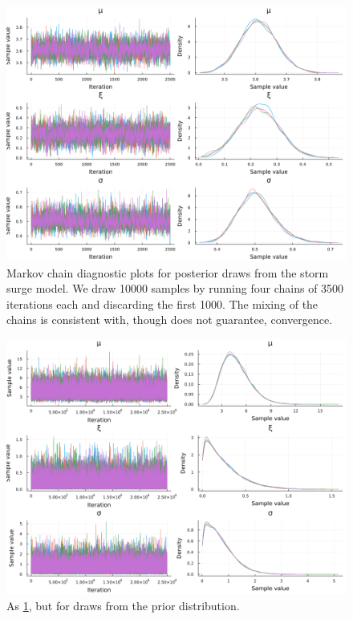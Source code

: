 \documentclass[11pt]{article}
\begin{document}
\begin{figure}
    \centering
    \includegraphics[width=\textwidth]{surge-posterior-chains}
    \caption{
        Markov chain diagnostic plots for posterior draws from the storm surge model.
        We draw \num{10000} samples by running four chains of \num{3500} iterations each and discarding the first \num{1000}.
        The mixing of the chains is consistent with, though does not guarantee, convergence.
    }\label{fig:surge-posterior-chains}
\end{figure}

\begin{figure}
    \centering
    \includegraphics[width=\textwidth]{surge-prior-chains}
    \caption{
        As \cref{fig:surge-posterior-chains}, but for draws from the prior distribution.
    }\label{fig:surge-prior-chains}
\end{figure}
\end{document}
